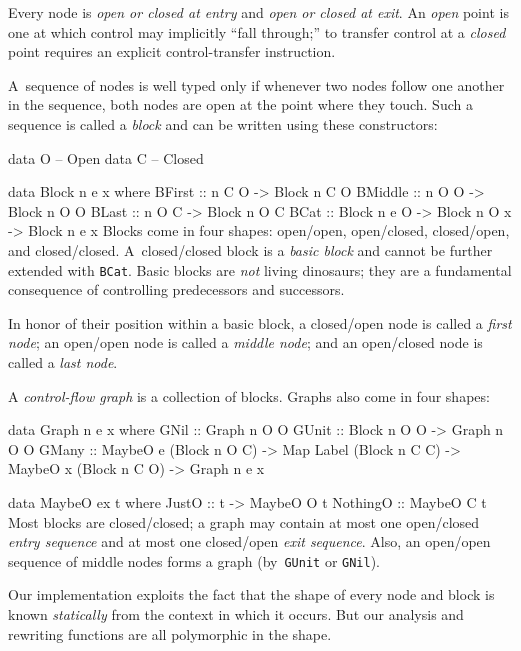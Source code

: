 \documentclass[twocolumn]{article}
\newenvironment{code}{\par\unskip\kern-6pt \small\verbatim}{\endverbatim}
\begin{document}
Every node is \emph{open or closed at entry}
and \emph{open or closed at exit}.  
An \emph{open} point is one at which control may implicitly ``fall through;''
to transfer control at a \emph{closed} point requires an explicit
control-transfer instruction.

A~sequence of nodes is well typed only if whenever two nodes follow
one another in the sequence, both nodes are open at the point where
they touch.
Such a sequence is called a \emph{block} and can be written using
these constructors:
\begin{code}
data O   -- Open
data C   -- Closed

data Block n e x where
 BFirst  :: n C O                      -> Block n C O
 BMiddle :: n O O                      -> Block n O O
 BLast   :: n O C                      -> Block n O C
 BCat    :: Block n e O -> Block n O x -> Block n e x
\end{code}
Blocks come in four shapes: open/open, open/closed, closed/open, and
closed/closed.
A~closed/closed block is a \emph{basic block} and cannot be further
extended with \texttt{BCat}.
Basic blocks are \emph{not} living dinosaurs; they are a fundamental
consequence of controlling predecessors and successors.

In honor of their position within a basic block, 
a closed/open node is called a \emph{first node}; 
an open/open node is called a \emph{middle node}; 
and
an open/closed node is called a \emph{last node}.


A \emph{control-flow graph} is a collection of blocks.
Graphs also come in four shapes:
\begin{code}
data Graph n e x where
  GNil  :: Graph n O O
  GUnit :: Block n O O -> Graph n O O
  GMany :: MaybeO e  (Block n O C) 
        -> Map Label (Block n C C)
        -> MaybeO x  (Block n C O)
        -> Graph n e x

data MaybeO ex t where
  JustO    :: t -> MaybeO O t
  NothingO ::      MaybeO C t
\end{code}
Most blocks are closed/closed; a graph may contain at most one
open/closed \emph{entry sequence} and at most one closed/open
\emph{exit sequence}.
Also, an open/open sequence of middle nodes forms a graph
(by~\texttt{GUnit} or \texttt{GNil}).



Our implementation exploits the fact that the shape of every node and
block is known \emph{statically} from the context in which it occurs.
But our analysis and rewriting functions are all polymorphic in the
shape.
\end{document}
